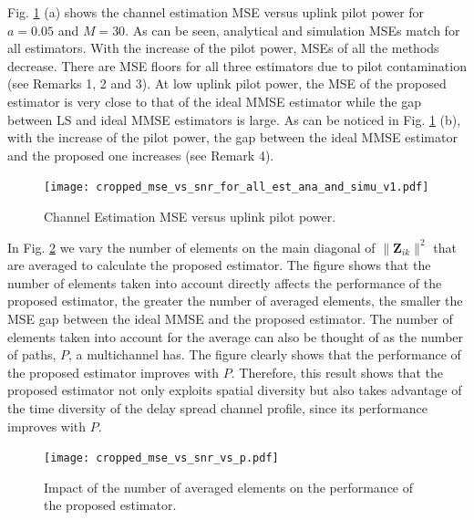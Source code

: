 \documentclass[10pt,journal,comsoc,final]{IEEEtran}
\begin{document}
Fig. \ref{fig:snr_vs_mse} (a) shows the channel estimation MSE versus uplink pilot power for $a = 0.05$ and $M = 30$. As can be seen, analytical and simulation MSEs match for all estimators. With the increase of the pilot power, MSEs of all the methods decrease. There are MSE floors for all three estimators due to pilot contamination (see Remarks 1, 2 and 3). At low uplink pilot power, the MSE of the proposed estimator is very close to that of the ideal MMSE estimator while the gap between LS and ideal MMSE estimators is large. As can be noticed in Fig. \ref{fig:snr_vs_mse} (b), with the increase of the pilot power, the gap between the ideal MMSE estimator and the proposed one increases (see Remark 4).

\begin{figure}[b]
\vspace{-5mm}
\centering
\texttt{[image: cropped\_mse\_vs\_snr\_for\_all\_est\_ana\_and\_simu\_v1.pdf]}
\caption{Channel Estimation MSE versus uplink pilot power.}
\label{fig:snr_vs_mse}
\end{figure}

In Fig. \ref{fig:snr_vs_mse_vs_avg} we vary the number of elements on the main diagonal of $\lVert \textbf{Z}_{ik} \rVert^{2}$ that are averaged to calculate the proposed estimator. The figure shows that the number of elements taken into account directly affects the performance of the proposed estimator, the greater the number of averaged elements, the smaller the MSE gap between the ideal MMSE and the proposed estimator. The number of elements taken into account for the average can also be thought of as the number of paths, $P$, a multichannel has. The figure clearly shows that the performance of the proposed estimator improves with $P$. Therefore, this result shows that the proposed estimator not only exploits spatial diversity but also takes advantage of the time diversity of the delay spread channel profile, since its performance improves with $P$.

\begin{figure}[t]
\centering
\texttt{[image: cropped\_mse\_vs\_snr\_vs\_p.pdf]}
\caption{Impact of the number of averaged elements on the performance of the proposed estimator.}
\label{fig:snr_vs_mse_vs_avg}
\vspace{-4mm}
\end{figure}
\end{document}
